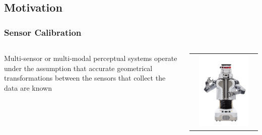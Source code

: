 \subsection{Motivation}

\begin{frame}
\frametitle{Sensor Calibration}

\begin{columns}

\begin{block}{}
Multi-sensor or multi-modal perceptual systems operate under the assumption that accurate geometrical
transformations between the sensors that collect the data are known
\end{block}

\begin{center}
\begin{tabular}{c}
\includegraphics[width=0.8\textwidth]{img/pr2/pr2_a}
\end{tabular}
\end{center}
\end{columns}
\end{frame}
